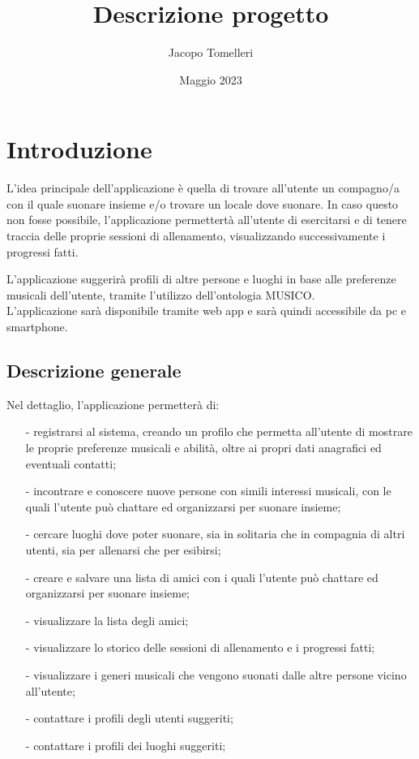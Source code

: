 \documentclass[12pt, a4paper]{article}
\title{Descrizione progetto}
\date{Maggio 2023}
\author{Jacopo Tomelleri}
\begin{document}
\maketitle
\newpage
\tableofcontents
\newpage
\section{Introduzione}

L'idea principale dell'applicazione è quella di trovare all'utente un compagno/a con il quale suonare insieme e/o trovare un locale dove suonare. In caso questo non fosse possibile, l'applicazione permettertà all'utente di esercitarsi e di tenere traccia delle proprie sessioni di allenamento, visualizzando successivamente i progressi fatti.

L'applicazione suggerirà profili di altre persone e luoghi in base alle preferenze musicali dell'utente, tramite l'utilizzo dell'ontologia MUSICO. \\ L'applicazione sarà disponibile tramite web app e sarà quindi accessibile da pc e smartphone.

\subsection{Descrizione generale}

Nel dettaglio, l'applicazione permetterà di:
\begin{itemize}
    \item[-] registrarsi al sistema, creando un profilo che permetta all'utente di mostrare le proprie preferenze musicali e abilità, oltre ai propri dati anagrafici ed eventuali contatti;
    \item[-] incontrare e conoscere nuove persone con simili interessi musicali, con le quali l'utente può chattare ed organizzarsi per suonare insieme;
    \item[-] cercare luoghi dove poter suonare, sia in solitaria che in compagnia di altri utenti, sia per allenarsi che per esibirsi;
    \item[-] creare e salvare una lista di amici con i quali l'utente può chattare ed organizzarsi per suonare insieme;
    \item[-] visualizzare la lista degli amici;
    \item[-] visualizzare lo storico delle sessioni di allenamento e i progressi fatti;
    \item[-] visualizzare i generi musicali che vengono suonati dalle altre persone vicino all'utente;
    \item[-] contattare i profili degli utenti suggeriti;
    \item[-] contattare i profili dei luoghi suggeriti;
\end{itemize}
\end{document}
